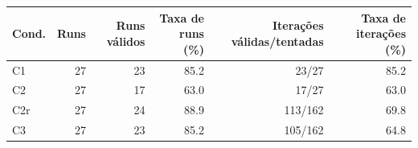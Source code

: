 \begin{tabular}{lrrrrr}
\toprule
Cond. & Runs & Runs v\'alidos & Taxa de runs (\%) & Itera\c{c}\~oes v\'alidas/tentadas & Taxa de itera\c{c}\~oes (\%) \\
\midrule
C1 & 27 & 23 & 85.2 & 23/27 & 85.2 \\
C2 & 27 & 17 & 63.0 & 17/27 & 63.0 \\
C2r & 27 & 24 & 88.9 & 113/162 & 69.8 \\
C3 & 27 & 23 & 85.2 & 105/162 & 64.8 \\
\bottomrule
\end{tabular}
